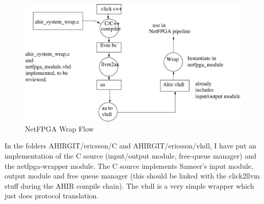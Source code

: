\documentclass{article}
\begin{document}
\begin{figure}
  \centering
  \includegraphics[scale=0.7]{NetFPGAWrap.eps}
  \caption{NetFPGA Wrap Flow}
  \label{fig:Wrap}
\end{figure}

In the folders AHIRGIT/ericsson/C and AHIRGIT/ericsson/vhdl,
I have put an implementation of the C source (input/output module, free-queue
manager) and the netfpga-wrapper module.  The C source implements
Sameer's input module, output module and free queue manager (this should
be linked with the click2llvm stuff during the AHIR compile chain).
The vhdl is a very simple wrapper which just does protocol
translation. 
\end{document}
